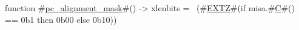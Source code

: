 function #\hyperref[sailRISCVzpczyalignmentzymask]{pc\_alignment\_mask}#() -> xlenbits =
  ~(#\hyperref[sailRISCVzEXTZ]{EXTZ}#(if misa.#\hyperref[sailRISCVzC]{C}#() == 0b1 then 0b00 else 0b10))
